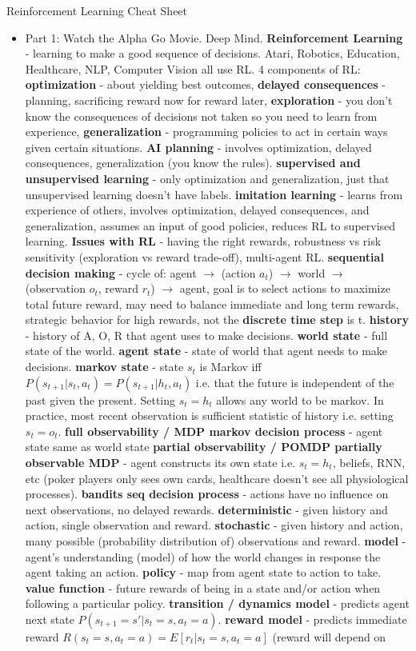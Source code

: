 \documentclass{article}
\begin{document}
Reinforcement Learning Cheat Sheet
\iffalse \tiny \fi
\begin{itemize}
\item Part 1: Watch the Alpha Go Movie. Deep Mind. \textbf{Reinforcement Learning} - learning to make a good sequence of decisions. Atari, Robotics, Education, Healthcare, NLP, Computer Vision all use RL. 4 components of RL: \textbf{optimization} - about yielding best outcomes, \textbf{delayed consequences} - planning, sacrificing reward now for reward later, \textbf{exploration} - you don't know the consequences of decisions not taken so you need to learn from experience, \textbf{generalization} - programming policies to act in certain ways given certain situations. \textbf{AI planning} - involves optimization, delayed consequences, generalization (you know the rules). \textbf{supervised and unsupervised learning} - only optimization and generalization, just that unsupervised learning doesn't have labels. \textbf{imitation learning} - learns from experience of others, involves optimization, delayed consequences, and generalization, assumes an input of good policies, reduces RL to supervised learning. \textbf{Issues with RL} - having the right rewards, robustness vs risk sensitivity (exploration vs reward trade-off), multi-agent RL.  \textbf{sequential decision making} - cycle of: agent $\rightarrow$ (action $a_t$) $\rightarrow$ world $\rightarrow$ (observation $o_t$, reward $r_t$) $\rightarrow$ agent, goal is to select actions to maximize total future reward, may need to balance immediate and long term rewards, strategic behavior for high rewards, not the \textbf{discrete time step} is t. \textbf{history} - history of A, O, R that agent uses to make decisions. \textbf{world state} - full state of the world. \textbf{agent state} - state of world that agent needs to make decisions. \textbf{markov state} - state $s_t$ is Markov iff $P(s_{t+1} | s_t, a_t) = P(s_{t+1} | h_t, a_t)$ i.e. that the future is independent of the past given the present. Setting $s_t = h_t$ allows any world to be markov. In practice, most recent observation is sufficient statistic of history i.e. setting $s_t = o_t$. \textbf{full observability / MDP markov decision process} - agent state same as world state \textbf{partial observability / POMDP partially observable MDP} - agent constructs its own state i.e. $s_t = h_t$, beliefs, RNN, etc (poker players only sees own cards, healthcare doesn't see all physiological processes). \textbf{bandits seq decision process} - actions have no influence on next observations, no delayed rewards. \textbf{deterministic} - given history and action, single observation and reward. \textbf{stochastic} - given history and action, many possible (probability distribution of) observations and reward. \textbf{model} - agent's understanding (model) of how the world changes in response the agent taking an action. \textbf{policy} - map from agent state to action to take. \textbf{value function} - future rewards of being in a state and/or action when following a particular policy. \textbf{transition / dynamics model} - predicts agent next state $P(s_{t+1}=s' | s_t=s, a_t=a)$. \textbf{reward model} - predicts immediate reward $R(s_t=s, a_t=a) = E[r_t | s_t=s, a_t=a]$ (reward will depend on 
\end{itemize}
\end{document}
